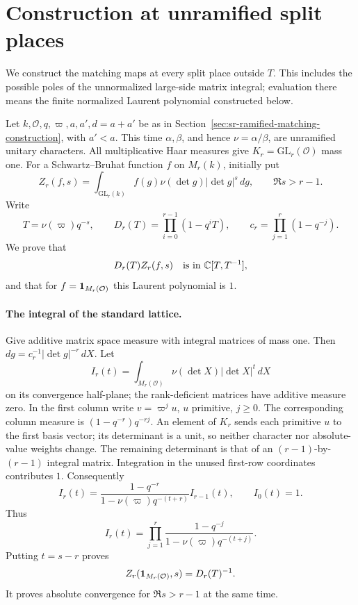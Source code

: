 \section{Construction at unramified split places}
\label{sec:sr-unramified-split-matching}

We construct the matching maps at every split place outside \(T\).
This includes the possible poles of the unnormalized large-side
matrix integral; evaluation there means the finite normalized
Laurent polynomial constructed below.

Let \(k,\mathcal O,q,\varpi,a,a',d=a+a'\) be as in
Section~\ref{sec:sr-ramified-matching-construction}, with
\(a'<a\).  This time \(\alpha,\beta\), and hence
\(\nu=\alpha/\beta\), are unramified unitary characters.
All multiplicative Haar measures give
\(K_r=\mathrm{GL}_r(\mathcal O)\) mass one.
For a Schwartz--Bruhat function \(f\) on \(M_r(k)\), initially put
\[
 Z_r(f,s)=\int_{\mathrm{GL}_r(k)}
                 f(g)\nu(\det g)|\det g|^s\,dg,
                    \qquad \Re s>r-1 .
\]
Write
\[
 T=\nu(\varpi)q^{-s},\qquad
 D_r(T)=\prod_{i=0}^{r-1}(1-q^iT),\qquad
 c_r=\prod_{j=1}^r(1-q^{-j}).
\]
We prove that
\begin{equation}
                       D_r(T)Z_r(f,s)
                 \quad\hbox{is in }\mathbb C[T,T^{-1}],
 \label{eq:sr-unr-Laurent}
\end{equation}
and that for \(f={\bf1}_{M_r(\mathcal O)}\) this Laurent
polynomial is \(1\).

\paragraph{The integral of the standard lattice.}
Give additive matrix space measure with integral matrices of
mass one.  Then \(dg=c_r^{-1}|\det g|^{-r}\,dX\).
Let
\[
 I_r(t)=\int_{M_r(\mathcal O)}
                         \nu(\det X)|\det X|^t\,dX
\]
on its convergence half-plane; the rank-deficient matrices
have additive measure zero.  In the first column write
\(v=\varpi^j u\), \(u\) primitive, \(j\ge0\).
The corresponding column measure is
\((1-q^{-r})q^{-rj}\).  An element of \(K_r\) sends each
primitive \(u\) to the first basis vector; its determinant is
a unit, so neither character nor absolute-value weights
change.  The remaining determinant is that of an
\((r-1)\)-by-\((r-1)\) integral matrix.  Integration in the
unused first-row coordinates contributes \(1\).
Consequently
\[
 I_r(t)=\frac{1-q^{-r}}
               {1-\nu(\varpi)q^{-(t+r)}}I_{r-1}(t),
                          \qquad I_0(t)=1.
\]
Thus
\[
 I_r(t)=\prod_{j=1}^r
            \frac{1-q^{-j}}{1-\nu(\varpi)q^{-(t+j)}}.
\]
Putting \(t=s-r\) proves
\[
         Z_r({\bf1}_{M_r(\mathcal O)},s)=D_r(T)^{-1}.
\]
It proves absolute convergence for \(\Re s>r-1\) at the same
time.

